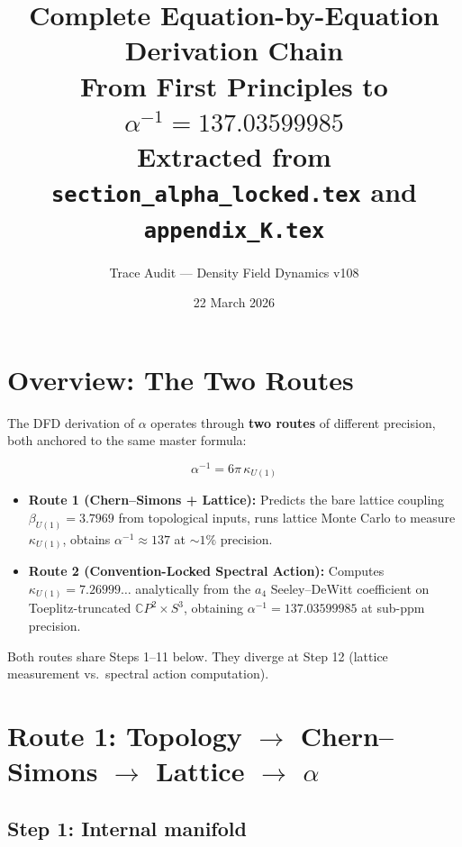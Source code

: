 \documentclass[12pt,a4paper]{article}
\title{Complete Equation-by-Equation Derivation Chain\\[6pt]
\large From First Principles to $\alpha^{-1} = 137.03599985$\\[4pt]
\normalsize Extracted from \texttt{section\_alpha\_locked.tex}
and \texttt{appendix\_K.tex}}
\author{Trace Audit --- Density Field Dynamics v108}
\date{22 March 2026}
\begin{document}
\maketitle

\tableofcontents
\newpage

\section{Overview: The Two Routes}

The DFD derivation of $\alpha$ operates through \textbf{two routes}
of different precision, both anchored to the same master formula:

\begin{equation}\tag{MASTER}
\boxed{\alpha^{-1} = 6\pi\,\kappa_{U(1)}}
\end{equation}

\begin{itemize}
\item \textbf{Route 1 (Chern--Simons + Lattice):} Predicts the bare lattice
  coupling $\beta_{U(1)} = 3.7969$ from topological inputs, runs lattice
  Monte Carlo to measure $\kappa_{U(1)}$, obtains $\alpha^{-1} \approx 137$
  at $\sim 1\%$ precision.

\item \textbf{Route 2 (Convention-Locked Spectral Action):} Computes
  $\kappa_{U(1)} = 7.26999\ldots$ analytically from the $a_4$ Seeley--DeWitt
  coefficient on Toeplitz-truncated $\mathbb{C}P^2 \times S^3$, obtaining
  $\alpha^{-1} = 137.03599985$ at sub-ppm precision.
\end{itemize}

Both routes share Steps 1--11 below.  They diverge at Step 12
(lattice measurement vs.\ spectral action computation).

\section{Route 1: Topology $\to$ Chern--Simons $\to$ Lattice $\to$ $\alpha$}
\label{sec:route1}

\subsection{Step 1: Internal manifold}
\end{document}

